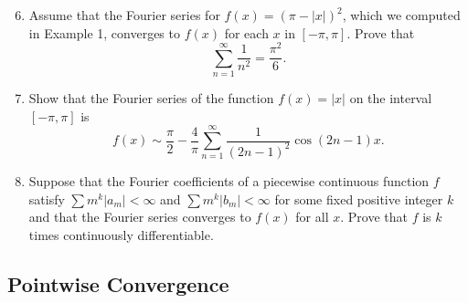\documentclass{article}
\begin{document}
\begin{enumerate}
    \setcounter{enumi}{5}
    \item Assume that the Fourier series for $f(x)=(\pi-\lvert x\rvert)^2$,
          which we computed in Example 1, converges to $f(x)$ for each $x$ in
          $[-\pi,\pi]$. Prove that
          \[
              \sum_{n=1}^\infty\frac{1}{n^2}=\frac{\pi^2}{6}.
          \]
          \setcounter{enumi}{7}
    \item Show that the Fourier series of the function $f(x)=\lvert x\rvert$ on
          the interval $[-\pi,\pi]$ is
          \[
              f(x) \sim \frac{\pi}{2}-\frac{4}{\pi}
              \sum_{n=1}^\infty\frac{1}{(2n-1)^2}\cos(2n-1)x.
          \]
          \setcounter{enumi}{9}
    \item Suppose that the Fourier coefficients of a piecewise continuous function
          $f$ satisfy $\sum m^k\lvert a_m\rvert<\infty$ and
          $\sum m^k\lvert b_m\rvert<\infty$ for some fixed positive integer $k$
          and that the Fourier series converges to $f(x)$ for all $x$. Prove that
          $f$ is $k$ times continuously differentiable.
\end{enumerate}

\subsection{Pointwise Convergence}
\end{document}
